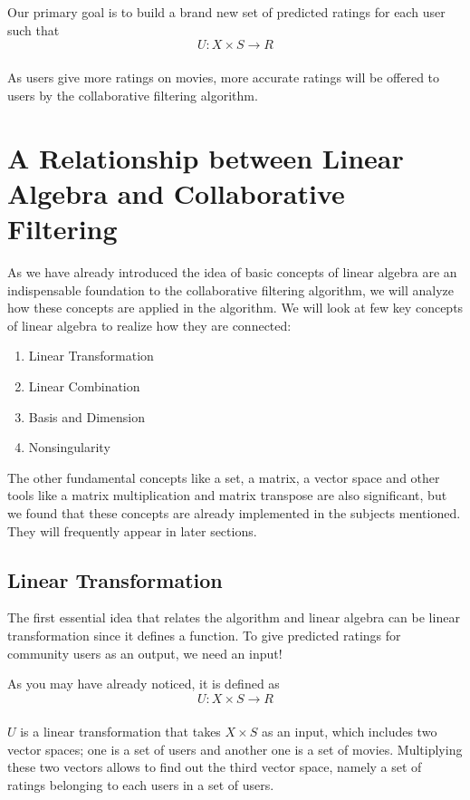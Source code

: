 \documentclass[paper=letter, fontsize=12pt]{scrartcl} %
\numberwithin{equation}{section} %
\numberwithin{figure}{section} %
\numberwithin{table}{section} %
\newcommand{\arrow}[1] {\xrightarrow[]{\text{#1}}}
\begin{document}
	Our primary goal is to build a brand new set of predicted ratings for
  each user such that
  \[
    U : X \times S \arrow{} R
  \]

  As users give more ratings on movies, more accurate ratings will be offered
  to users by the collaborative filtering algorithm.

  \pagebreak

  \section{A Relationship between Linear Algebra and Collaborative Filtering}

  As we have already introduced the idea of basic concepts of linear algebra are an
  indispensable foundation to the collaborative filtering algorithm, we will analyze how these concepts are applied in the algorithm. We will look at few key concepts of linear algebra to realize how they are connected:

  \begin{enumerate}
  \item Linear Transformation
  \item Linear Combination
  \item Basis and Dimension
  \item Nonsingularity
  \end{enumerate}

  The other fundamental concepts like a set, a matrix, a vector space and other
  tools like a matrix multiplication and matrix transpose are also significant, but we found that these concepts are already implemented in the subjects mentioned. They will frequently appear in later sections. \\

  \subsection{Linear Transformation}

  The first essential idea that relates the algorithm and linear algebra can be linear transformation since it defines a function. To
  give predicted ratings for community users as an output, we need an input!

  As you may have already noticed, it is defined as
  \[
    U : X \times S \arrow{} R
  \]

  \(U\) is a linear transformation that takes \(X \times S\) as an input, which
  includes two vector spaces; one is a set of users and another one is a set of
  movies. Multiplying these two vectors allows to find out the third vector
  space, namely a set of ratings belonging to each users in a set of users. \\
\end{document}
